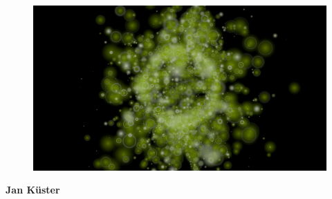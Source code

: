 \documentclass[11pt,A4]{article}
\begin{document}
\pagestyle{fancy}
\begin{figure}[htbp]
    \begin{center}
            \includegraphics[trim=0 150 0 150,clip,width=\textwidth]{4436.png}
    \end{center}
\end{figure}
\vspace{-20pt}
\Huge{\textbf{Jan Küster}}
\end{document}

